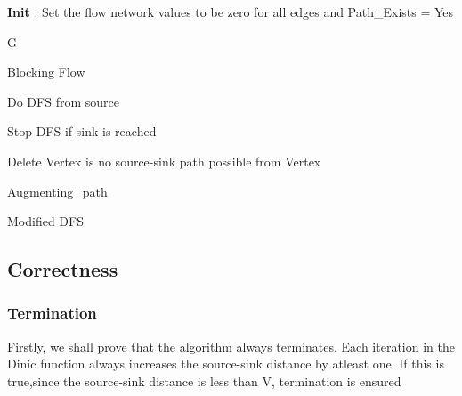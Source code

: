 \documentclass[paper=a4, fontsize=11pt]{scrartcl} %
\numberwithin{equation}{section} %
\numberwithin{figure}{section} %
\numberwithin{table}{section} %
\begin{document}

\begin{algorithm}[H]
\textbf{Init} : Set the flow network values to be zero for all edges and Path\_Exists = Yes

\Return G
\caption{Blocking Flow}
\end{algorithm}



\begin{algorithm}[h]

Do DFS from source

Stop DFS if sink is reached

Delete Vertex is no source-sink path possible from Vertex


\Return Augmenting\_path
\caption{Modified DFS}
\end{algorithm}





\subsection{Correctness}

\subsubsection{Termination}
Firstly, we shall prove that the algorithm always terminates. Each iteration in the Dinic function always increases the source-sink distance by atleast one. If this is true,since the source-sink distance is less than V, termination is ensured
\end{document}
